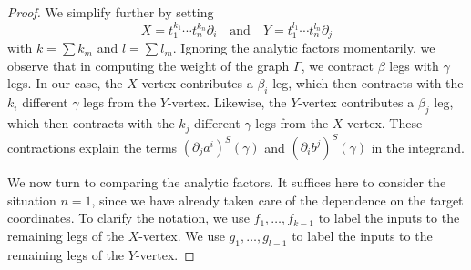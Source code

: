 \documentclass[10pt]{amsart}
\begin{document}
\begin{proof}
We simplify further by setting
\[
X = t_1^{k_1} \cdots t_n^{k_n} \partial_i \quad\text{and}\quad Y = t_1^{l_1} \cdots t_n^{l_n} \partial_j
\]
with $k =\sum k_m$ and $l = \sum l_m$.
Ignoring the analytic factors momentarily, 
we observe that in computing the weight of the graph $\Gamma$,
we contract $\beta$ legs with $\gamma$ legs.
In our case, the $X$-vertex contributes a $\beta_i$ leg,
which then contracts with the $k_i$ different $\gamma$ legs from the $Y$-vertex.
Likewise, the $Y$-vertex contributes a $\beta_j$ leg,
which then contracts with the $k_j$ different $\gamma$ legs from the $X$-vertex.
These contractions explain the terms $(\partial_j a^i)^S(\gamma)$ and $(\partial_i b^j)^S(\gamma)$ in the integrand.

We now turn to comparing the analytic factors. It suffices here to consider the situation $n =1$,
since we have already taken care of the dependence on the target coordinates.
To clarify the notation, we use $f_1, \ldots, f_{k-1}$ to label the inputs to the remaining legs of the $X$-vertex.
We use $g_1,\ldots, g_{l-1}$ to label the inputs to the remaining legs of the $Y$-vertex.


\end{proof}
\end{document}
